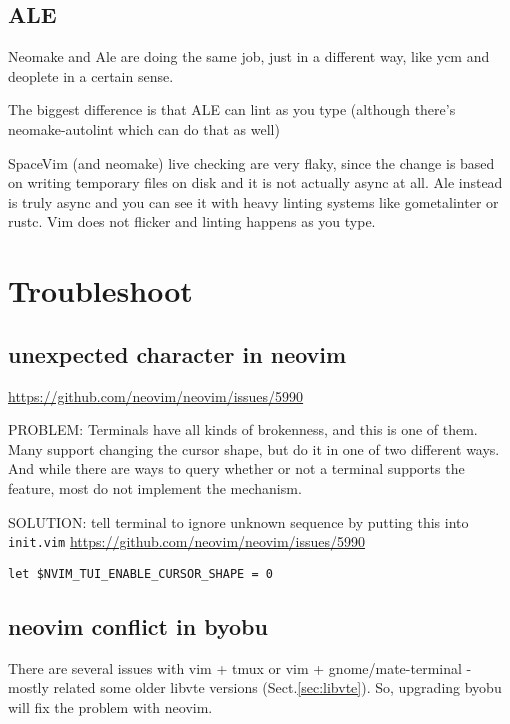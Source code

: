 \subsection{ALE}
\label{sec:ALE}


Neomake and Ale are doing the same job, just in a different way, like ycm and
deoplete in a certain sense.

The biggest difference is that ALE can lint as you type (although there's
neomake-autolint which can do that as well)


SpaceVim (and neomake) live checking are very flaky, since the change is based
on writing temporary files on disk and it is not actually async at all.
Ale instead is truly async and you can see it with heavy linting systems like
gometalinter or rustc. Vim does not flicker and linting happens as you type.



\section{Troubleshoot}

\subsection{unexpected character in neovim}


\url{https://github.com/neovim/neovim/issues/5990}

PROBLEM: Terminals have all kinds of brokenness, and this is one of them. Many
support changing the cursor shape, but do it in one of two different ways. And
while there are ways to query whether or not a terminal supports the feature,
most do not implement the mechanism.   


SOLUTION: tell terminal to ignore unknown sequence by putting this into
\verb!init.vim!
\url{https://github.com/neovim/neovim/issues/5990}
\begin{verbatim}
let $NVIM_TUI_ENABLE_CURSOR_SHAPE = 0
\end{verbatim}

\subsection{neovim conflict in byobu}
\label{sec:byobu-neovim}
\label{sec:neovim-byobu}

There are several issues with vim + tmux or vim + gnome/mate-terminal - mostly
related some older libvte versions (Sect.\ref{sec:libvte}). So, upgrading byobu
will fix the problem with neovim.

